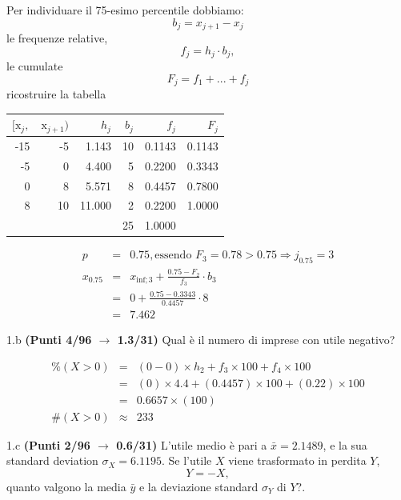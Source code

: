 \documentclass[
  11pt,
]{book}
\theoremstyle{mytheoremstyle}
\theoremstyle{mydefstyle}
\newenvironment{sol}
  {
  \begin{tcolorbox}[enhanced,breakable,arc=0.1mm,boxrule=1pt,colback=white,colframe=iblue,
  title=\bf \fontfamily{lmss}\selectfont \hspace{.5 cm} Soluzione,drop fuzzy shadow]

}{
\end{tcolorbox}
  }
\begin{document}
\begin{sol}
Per individuare il 75-esimo percentile dobbiamo:
\[
b_j=x_{j+1}-x_{j}
\]
le frequenze relative,
\[
f_j=h_j\cdot b_j,
\]
le cumulate
\[
F_j=f_1+...+f_j
\]
ricostruire la tabella

\begin{table}[H]
\centering
\begin{tabular}{rrrrrr}
\toprule
$[\text{x}_j,$ & $\text{x}_{j+1})$ & $h_j$ & $b_j$ & $f_j$ & $F_j$\\
\midrule
-15 & -5 & 1.143 & 10 & 0.1143 & 0.1143\\
-5 & 0 & 4.400 & 5 & 0.2200 & 0.3343\\
0 & 8 & 5.571 & 8 & 0.4457 & 0.7800\\
8 & 10 & 11.000 & 2 & 0.2200 & 1.0000\\
 &  &  & 25 & 1.0000 & \\
\bottomrule
\end{tabular}
\end{table}

\begin{eqnarray*}
  p &=&  0.75 , \text{essendo }F_{ 3 }= 0.78  > 0.75  \Rightarrow j_{ 0.75 }= 3 \\
  x_{ 0.75 } &=& x_{\text{inf}; 3 } + \frac{ { 0.75 } - F_{ 2 }} {f_{ 3 }} \cdot b_{ 3 } \\
            &=&  0  + \frac {{ 0.75 } -  0.3343 } { 0.4457 } \cdot  8  \\
            &=&  7.462 
\end{eqnarray*}

\end{sol}

1.b \textbf{(Punti 4/96 \(\rightarrow\) 1.3/31)} Qual è il numero di imprese con utile negativo?

\begin{sol}
\begin{eqnarray*}
     \%(X> 0 ) &=& ( 0 - 0 )\times h_{ 2 }+ f_{ 3 }\times 100+f_{ 4 }\times 100 \\
              &=& ( 0 )\times 4.4 + ( 0.4457 )\times 100+( 0.22 )\times 100 \\
              &=&  0.6657 \times(100)\\
     \#(X> 0 ) &\approx& 233 
         \end{eqnarray*}

\end{sol}

1.c \textbf{(Punti 2/96 \(\rightarrow\) 0.6/31)} L'utile medio è pari a \(\bar x=2.1489\), e la sua standard deviation
\(\sigma_X=6.1195\). Se l'utile \(X\) viene trasformato in perdita \(Y\),
\[
Y=-X,
\]
quanto valgono la media \(\bar y\) e la deviazione standard \(\sigma_Y\) di \(Y\)?.
\end{document}
